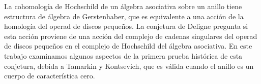 \documentclass[TFM.tex]{subfiles}
\begin{document}

La cohomología de Hochschild de un álgebra asociativa sobre un anillo tiene estructura de álgebra de Gerstenhaber, que es equivalente a una acción de la homología del operad de discos pequeños. La conjetura de Deligne pregunta si esta acción proviene de una acción del complejo de cadenas singulares del operad de discos pequeños en el complejo de Hochschild del álgebra asociativa. En este trabajo examinamos algunos aspectos de la primera prueba histórica de esta conjetura, debida a Tamarkin y Kontsevich, que es válida cuando el anillo es un cuerpo de característica cero.
\end{document}
